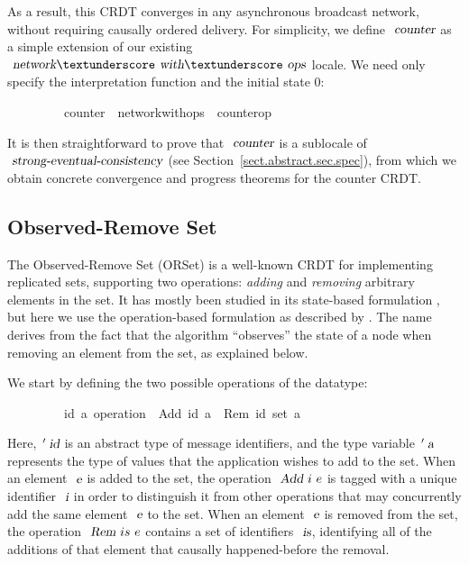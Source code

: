 As a result, this CRDT converges in any asynchronous broadcast network, without requiring causally ordered delivery.
For simplicity, we define $\isa{counter}$ as a simple extension of our existing $\isa{network}{\isacharunderscore}\isa{with}{\isacharunderscore}\isa{ops}$ locale.
We need only specify the interpretation function and the initial state 0:
\vspace{0.25em}
\begin{isabellebody}
\ \ \ \ \ \ \ \ \ counter\ {\isacharequal}\ network{\isacharunderscore}with{\isacharunderscore}ops\ {\isacharunderscore}\ counter{\isacharunderscore}op\ {}
\end{isabellebody}
\vspace{0.25em}
It is then straightforward to prove that $\isa{counter}$ is a sublocale of $\isa{strong-eventual-consistency}$ (see Section~\ref{sect.abstract.sec.spec}), from which we obtain concrete convergence and progress theorems for the counter CRDT.

\subsection{Observed-Remove Set}
\label{subsect.orset}

The Observed-Remove Set (ORSet) is a well-known CRDT for implementing replicated sets, supporting two operations: \emph{adding} and \emph{removing} arbitrary elements in the set.
It has mostly been studied in its state-based formulation \cite{Bieniusa:2012wu,Bieniusa:2012gt,Brown:2014hs,Zeller:2014fl}, but here we use the operation-based formulation as described by \citet{Shapiro:2011wy}.
The name derives from the fact that the algorithm ``observes'' the state of a node when removing an element from the set, as explained below.

We start by defining the two possible operations of the datatype:
\vspace{0.25em}
\begin{isabellebody}
\ \ \ \ \ \ \ \ \ {\isacharparenleft}{\isacharprime}id{\isacharcomma}\ {\isacharprime}a{\isacharparenright}\ operation\ {\isacharequal}\ Add\ {\isachardoublequoteopen}{\isacharprime}id{\isachardoublequoteclose}\ {\isachardoublequoteopen}{\isacharprime}a{\isachardoublequoteclose}\ {\isacharbar}\ Rem\ {\isachardoublequoteopen}{\isacharparenleft}{\isacharprime}id\ set{\isacharparenright}{\isachardoublequoteclose}\ {\isachardoublequoteopen}{\isacharprime}a{\isachardoublequoteclose}
\end{isabellebody}
\vspace{0.25em}
\noindent Here, $\isacharprime\isa{id}$ is an abstract type of message identifiers, and the type variable $\isacharprime\isa{a}$ represents the type of values that the application wishes to add to the set.
When an element $\isa{e}$ is added to the set, the operation $\isa{Add}\ i\ e$ is tagged with a unique identifier $\isa{i}$ in order to distinguish it from other operations that may concurrently add the same element $\isa{e}$ to the set.
When an element $\isa{e}$ is removed from the set, the operation $\isa{Rem}\ is\ e$ contains a set of identifiers $\isa{is}$, identifying all of the additions of that element that causally happened-before the removal.


